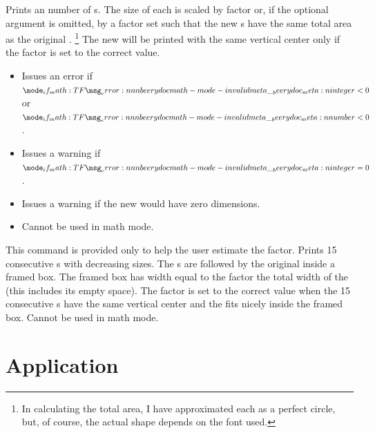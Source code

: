 \documentclass{beerydoc}
\begin{document}
\begin{code}{\scaletextbullets}
  \begin{syntax}
      
  \end{syntax}
  Prints an  number of s.
  The size of each  is scaled by factor  or, if the
  optional argument is omitted, by a factor set such that the new
  s have the same total area as the original .%
  \footnote
    {%
      In calculating the total area, I have approximated each 
      as a perfect circle, but, of course, the actual shape depends on the font
      used.%
    }
  The new  will be printed with the same vertical center only if
  the  factor is set to the correct value.

  \begin{itemize}
    \item
    Issues an error if $\meta{integer}<\num{0}$ or $\meta{number}<\num{0}$.
    \item
    Issues a warning if $\meta{integer}=\num{0}$.
    \item
    Issues a warning if the new  would have zero dimensions.
    \item
    Cannot be used in math mode.
  \end{itemize}
\end{code}

\begin{code}{\scaletextbulletdebug}
  This command is provided only to help the user estimate the 
  factor.
  Prints \num{15} consecutive s with decreasing sizes.
  The s are followed by the original  inside a
  framed box.
  The framed box has width equal to the  factor \texttimes{} the
  total width of the  (this includes its empty space).
  The  factor is set to the correct value when the \num{15}
  consecutive s have the same vertical center and the
   fits nicely inside the framed box.
  Cannot be used in math mode.
\end{code}


\section{Application}
\label{sec:application}
\end{document}
